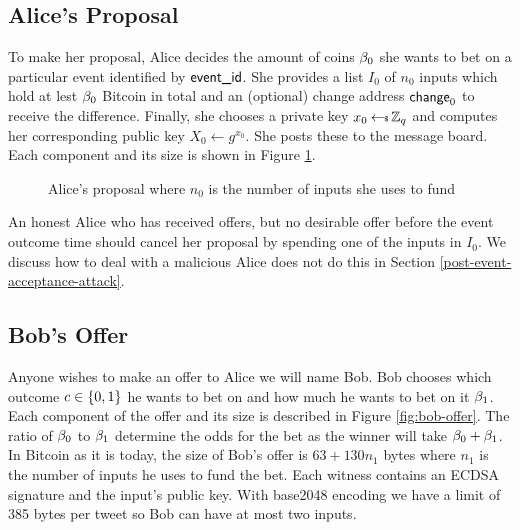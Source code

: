 \documentclass[runningheads]{llncs}
\begin{document}
\subsection{Alice's Proposal}

To make her proposal, Alice decides the amount of coins $\beta_0$ she wants to bet on a particular event identified by $\textsf{event\_id}$. She provides a list $I_0$ of $n_0$ inputs which hold at lest $\beta_0$ Bitcoin in total and an (optional) change address $\textsf{change}_0$ to receive the difference. Finally, she chooses a private key $x_0 \hskip2.3pt{\gets\!\!\mbox{\tiny${\$}$\normalsize}}\, \mathbb{Z}_q$ and computes her corresponding public key $X_0 \gets g^{x_0}$. She posts these to the message board. Each component and its size is shown in Figure \ref{fig:alice-proposal}.

\begin{figure}[h!]
  \centering
  \caption{Alice's proposal where $n_0$ is the number of inputs she uses to fund}
  \label{fig:alice-proposal}
\end{figure}

An honest Alice who has received offers, but no desirable offer before the event outcome time should cancel her proposal by spending one of the inputs in $I_0$. We discuss how to deal with a malicious Alice does not do this in Section
\ref{post-event-acceptance-attack}.



\subsection{Bob's Offer}

Anyone wishes to make an offer to Alice we will name Bob. Bob chooses which outcome $c \in \{0,1\}$ he wants to bet on and how much he wants to bet on it $\beta_1$. Each component of the offer and its size is described in Figure \ref{fig:bob-offer}. The ratio of $\beta_0$ to $\beta_1$ determine the odds for the bet as the winner will take $\beta_0 + \beta_1$. In Bitcoin as it is today, the size of Bob's offer is $63 + 130n_1$ bytes where $n_1$ is the number of inputs he uses to fund the bet. Each witness contains an ECDSA signature and the input's public key. With base2048 encoding\cite{base2048} we have a limit of 385 bytes per tweet so Bob can have at most two inputs.
\end{document}
